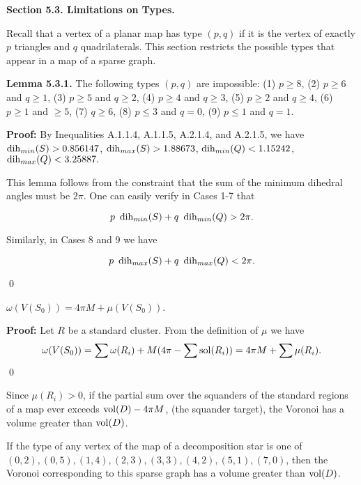 \bigskip

{\bf Section 5.3. Limitations on Types.}

\bigskip

Recall that a vertex of a planar map has type $(p,q)$ if it is the vertex of exactly $p$ triangles and $q$ quadrilaterals.  This section restricts the possible types that appear in a map of a sparse graph.  


{\bf Lemma 5.3.1.} The following types $(p,q)$ are impossible: (1) $p\geq 8$, (2) $p\geq6$ and $q \geq 1$, (3) $p \geq 5$ and $q\geq 2$, (4) $p\geq 4$ and $q \geq 3$, (5) $p \geq 2$ and $q \geq 4$, (6) $p\ge 1$ and $\ge 5$, (7) $q \geq 6$, (8) $p \leq 3$ and $q=0$, (9) $p \leq 1$ and $q=1$. 

{\bf Proof:}  By Inequalities A.1.1.4, A.1.1.5, A.2.1.4, and  A.2.1.5,  we have\newline
$\operatorname{dih}_{min}(S)>0.856147$, \newline
$\operatorname{dih}_{max}(S)>1.88673$, \newline
$\operatorname{dih}_{min}(Q)<1.15242$, \newline
$\operatorname{dih}_{max}(Q)<3.25887.$ \newline

  This lemma follows from the constraint that the sum of the minimum dihedral angles must be $2 \pi$.  One can easily verify in Cases 1-7 that 

$$p\ \dih_{min}(S)  + q\ \dih_{min}(Q)  > 2 \pi.$$  

Similarly, in Cases 8 and 9 we have 

$$p\ \dih_{max}(S)  + q\ \dih_{max}(Q)  < 2 \pi.$$
 
\qed

 $\omega(V(S_0))=4 \pi M + \mu(V(S_0))$. \endproclaim

{\bf Proof:} Let $R$ be a standard cluster.  From the definition of $\mu$ we have $$\omega(V(S_0))=\sum \omega(R_i)+ M (4\pi - \sum \operatorname{sol}(R_i)) = 4 \pi M + \sum \mu(R_i).$$ \qed

Since $\mu(R_i) > 0$, if the partial sum over the squanders of the standard regions of a map ever exceeds $\operatorname{vol}(D)-4\pi M$, (the squander target), the Voronoi has a volume greater than $\operatorname{vol}(D)$.  

\bigskip

 If the type of any vertex of the map of a decomposition star is one of $(0,2), (0,5), (1,4), (2,3), (3,3), (4,2),(5,1), (7,0)$, then the Voronoi corresponding to this sparse graph has a volume greater than $\operatorname{vol}(D)$. \endproclaim

